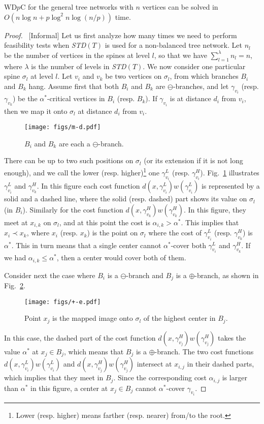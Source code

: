 \documentclass{llncs}
\begin{document}
{\begin{theorem}\label{thm:general2}
WD$p$C for the general tree networks with $n$ vertices can be solved in
 $O(n \log n+p\log^2 n\log (n/p))$ time.
\end{theorem}
\begin{proof}
~[Informal]
Let us first analyze how many times we need to perform feasibility tests
when {\it STD}$(T)$ is used for a non-balanced tree network.
Let $n_l$ be the number of vertices in the spines at level $l$,
so that we have $\sum_{l=1}^{\lambda} n_l=n$,
where $\lambda$ is the number of levels in {\it STD}$(T)$.
We now consider one particular spine $\sigma_l$ at level $l$.
Let $v_i$ and $v_k$ be two vertices on $\sigma_l$,
from which branches $B_i$ and $B_k$ hang.
Assume first that both $B_i$ and $B_k$ are $\ominus$-branches,
and let $\gamma_{v_i}$ (resp. $\gamma_{v_k}$) be the $\alpha^*$-critical vertices in
$B_i$ (resp. $B_k$).
If $\gamma_{v_i}$ is at distance $d_i$ from $v_i$,
then we map it onto $\sigma_l$ at distance $d_i$ from $v_i$.
\begin{figure}[ht]
\centering
\texttt{[image: figs/m-d.pdf]}
\caption{$B_i$ and $B_k$ are each a $\ominus$-branch. 
}
\label{fig:--d}
\end{figure}
There can be up to two such positions on $\sigma_l$ (or its extension if it is not long enough),
and we call the lower (resp. higher)\footnote{Lower (resp. higher) means farther (resp. nearer) from/to
the root.}
one $\gamma^L_{v_i}$ (resp. $\gamma^H_{v_i}$).
Fig.~\ref{fig:--d} illustrates $\gamma^L_{v_i}$ and $\gamma^H_{v_k}$.
In this figure each cost function $d(x,\gamma^L_{v_i})w(\gamma^L_{v_i})$
is represented by a solid and a dashed line,
where the solid (resp. dashed) part shows its value on $\sigma_l$ (in $B_i$).
Similarly for the cost function $d(x,\gamma^H_{v_k})w(\gamma^H_{v_k})$.
In this figure, they meet at $x_{i,k}$ on $\sigma_l$,
and at this point the cost is $\alpha_{i,k} >\alpha^*$.
This implies that $x_i \prec x_k$,
where $x_i$ (resp. $x_k$) is the point on $\sigma_l$ where the cost of
$\gamma^L_{v_i}$ (resp. $\gamma^H_{v_k}$) is $\alpha^*$.
This in turn means that a single center cannot $\alpha^*$-cover both $\gamma^L_{v_i}$
and $\gamma^H_{v_k}$.
If we had $\alpha_{i,k} \leq \alpha^*$,
then a center would cover both of them.

Consider next the case where $B_i$ is a $\ominus$-branch and $B_j$ is a $\oplus$-branch,
as shown in Fig.~\ref{fig:+-d}.
\begin{figure}[ht]
\centering
\texttt{[image: figs/+-e.pdf]}
\caption{
Point $x_j$ is the mapped image onto $\sigma_l$ of the highest center in $B_j$.
}
\label{fig:+-d}
\end{figure}
In this case, the dashed part of the cost function $d(x,\gamma^H_{v_j})w(\gamma^H_{v_j})$
takes the value $\alpha^*$ at $x_j\in B_j$,
which means that $B_j$ is a $\oplus$-branch.
The two cost functions $d(x,\gamma^L_{v_i})w(\gamma^L_{v_i})$ and 
$d(x,\gamma^H_{v_j})w(\gamma^H_{v_j})$ intersect at $x_{i,j}$ in their dashed parts,
which implies that they meet in $B_j$.
Since the corresponding cost $\alpha_{i,j}$ is larger than $\alpha^*$ in this figure,
a center at $x_j\in B_j$ cannot $\alpha^*$-cover $\gamma_{v_i}$.


\end{proof}}
\end{document}
